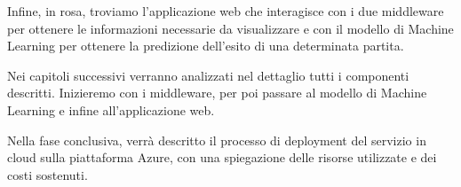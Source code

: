 Infine, in rosa, troviamo l'applicazione web che interagisce con i due middleware per ottenere le informazioni necessarie da visualizzare e con il modello di Machine Learning per ottenere la predizione dell'esito di una determinata partita.

\vspace{+20px}

Nei capitoli successivi verranno analizzati nel dettaglio tutti i componenti descritti. Inizieremo con i middleware, per poi passare al modello di Machine Learning e infine all'applicazione web.

Nella fase conclusiva, verrà descritto il processo di deployment del servizio in cloud sulla piattaforma Azure, con una spiegazione delle risorse utilizzate e dei costi sostenuti.